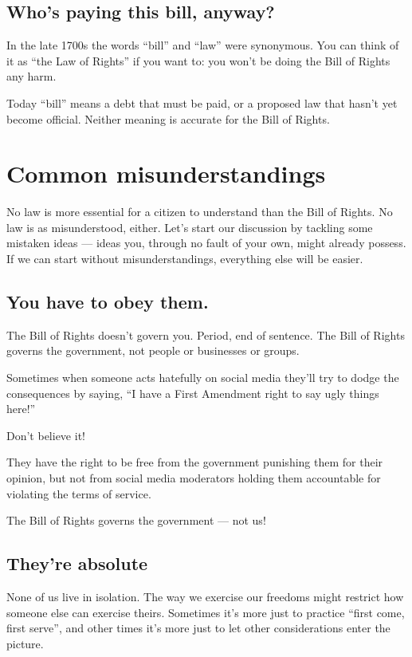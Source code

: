 \documentclass[10pt]{article}
\begin{document}
\subsection{Who's paying this bill, anyway?}

In the late 1700s the words ``bill'' and ``law'' were synonymous.  You can think of it as ``the Law of Rights'' if you want to: you won't be doing the Bill of Rights any harm.

Today ``bill'' means a debt that must be paid, or a proposed law that hasn't yet become official.  Neither meaning is accurate for the Bill of Rights.

\section{Common misunderstandings}

No law is more essential for a citizen to understand than the Bill of Rights.  No law is as misunderstood, either.  Let's start our discussion by tackling some mistaken ideas --- ideas you, through no fault of your own, might already possess.  If we can start without misunderstandings, everything else will be easier.

\subsection{You have to obey them.}

The Bill of Rights doesn't govern you.  Period, end of sentence.  The Bill of Rights governs the government, not people or businesses or groups.

Sometimes when someone acts hatefully on social media they'll try to dodge the consequences by saying, ``I have a First Amendment right to say ugly things here!''
  
Don't believe it!
  
They have the right to be free from the government punishing them for their opinion, but not from social media moderators holding them accountable for violating the terms of service.

The Bill of Rights governs the government --- not us!

\subsection{They're absolute}
None of us live in isolation.  The way we exercise our freedoms might restrict how someone else can exercise theirs.  Sometimes it's more just to practice ``first come, first serve'', and other times it's more just to let other considerations enter the picture.
\end{document}
